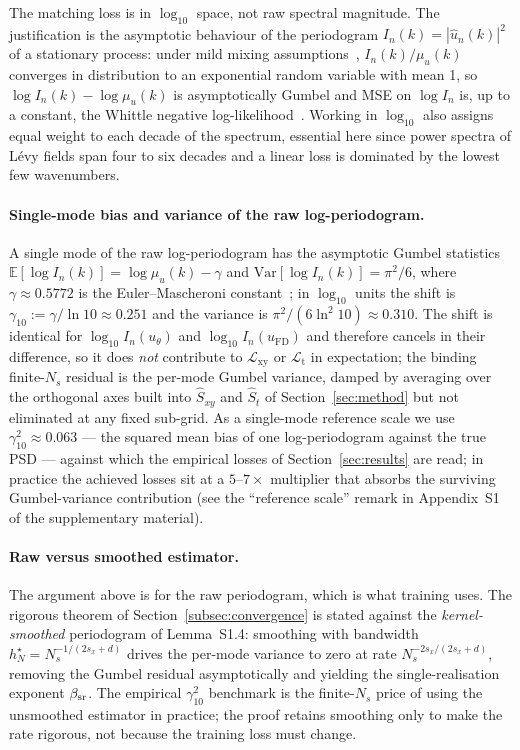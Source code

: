 \documentclass[review,12pt]{elsarticle}
\begin{document}
The matching loss is in \(\log_{10}\) space, not raw spectral
magnitude. The justification is the asymptotic behaviour of the
periodogram \(I_n(k) = |\widehat u_n(k)|^2\) of a stationary
process: under mild mixing
assumptions~\cite{Brillinger1981,Dahlhaus1996},
\(I_n(k) / \mu_u(k)\) converges in distribution to an exponential
random variable with mean 1, so \(\log I_n(k) - \log \mu_u(k)\)
is asymptotically Gumbel and MSE on \(\log I_n\) is, up to a
constant, the Whittle negative
log-likelihood~\cite{Whittle1953}. Working in \(\log_{10}\) also
assigns equal weight to each decade of the spectrum, essential
here since power spectra of L\'evy fields span four to six
decades and a linear loss is dominated by the lowest few
wavenumbers.

\paragraph{Single-mode bias and variance of the raw log-periodogram.}
A single mode of the raw log-periodogram has the asymptotic Gumbel
statistics
\(\mathbb E[\log I_n(k)] = \log\mu_u(k) - \gamma\) and
\(\mathrm{Var}[\log I_n(k)] = \pi^2/6\), where
\(\gamma \approx 0.5772\) is the Euler--Mascheroni
constant~\cite{Brillinger1981}; in
\(\log_{10}\) units the shift is
\(\gamma_{10} := \gamma/\ln 10 \approx 0.251\) and the variance is
\(\pi^2/(6\ln^2\!10) \approx 0.310\). The shift is identical for
\(\log_{10}\!I_n(u_\theta)\) and \(\log_{10}\!I_n(u_{\mathrm{FD}})\) and
therefore cancels in their difference, so it does \emph{not}
contribute to \(\mathcal L_{\mathrm{xy}}\) or \(\mathcal L_{\mathrm{t}}\)
in expectation; the binding finite-\(N_s\) residual is the per-mode
Gumbel variance, damped by averaging over the orthogonal axes built
into \(\widehat S_{xy}\) and \(\widehat S_t\) of Section~\ref{sec:method}
but not eliminated at any fixed sub-grid. As a single-mode reference
scale we use \(\gamma_{10}^2 \approx 0.063\) --- the squared mean
bias of one log-periodogram against the true PSD --- against which
the empirical losses of Section~\ref{sec:results} are read; in
practice the achieved losses sit at a \(5\)--\(7\times\) multiplier
that absorbs the surviving Gumbel-variance contribution (see the
``reference scale'' remark in Appendix~S1 of the supplementary
material).

\paragraph{Raw versus smoothed estimator.}
The argument above is for the raw periodogram, which is what training
uses. The rigorous theorem of Section~\ref{subsec:convergence} is
stated against the \emph{kernel-smoothed} periodogram of
Lemma~S1.4: smoothing with bandwidth
\(h_N^\star = N_s^{-1/(2s_x+d)}\) drives the per-mode variance to
zero at rate \(N_s^{-2s_x/(2s_x+d)}\), removing the Gumbel residual
asymptotically and yielding the single-realisation exponent
\(\beta_{\rm sr}\). The empirical \(\gamma_{10}^2\) benchmark is the
finite-\(N_s\) price of using the unsmoothed estimator in practice;
the proof retains smoothing only to make the rate rigorous, not
because the training loss must change.
\end{document}
